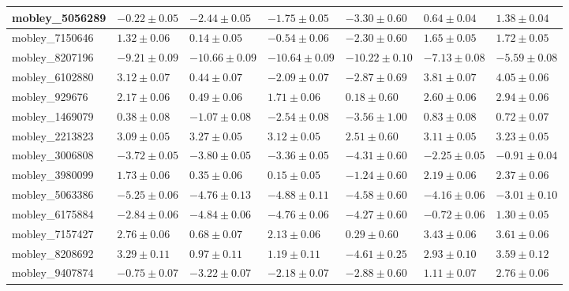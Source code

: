 \documentclass{article}
\begin{document}
\begin{landscape}
\begin{longtable}{|l{3.0cm}|l{3.0cm}|l{3.2cm}|l{3.6cm}|l{3.0cm}|l{3.0cm}|l{3.0cm}|}
mobley\_5056289	&	$	-0.22	\pm	0.05	$	&	$	-2.44	\pm	0.05	$	&	$	-1.75	\pm	0.05	$	&	$	-3.30	\pm	0.60	$	&	$	0.64	\pm	0.04	$	&	$	1.38	\pm	0.04	$	\\ \hline
mobley\_7150646	&	$	1.32	\pm	0.06	$	&	$	0.14	\pm	0.05	$	&	$	-0.54	\pm	0.06	$	&	$	-2.30	\pm	0.60	$	&	$	1.65	\pm	0.05	$	&	$	1.72	\pm	0.05	$	\\ \hline
mobley\_8207196	&	$	-9.21	\pm	0.09	$	&	$	-10.66	\pm	0.09	$	&	$	-10.64	\pm	0.09	$	&	$	-10.22	\pm	0.10	$	&	$	-7.13	\pm	0.08	$	&	$	-5.59	\pm	0.08	$	\\ \hline
mobley\_6102880	&	$	3.12	\pm	0.07	$	&	$	0.44	\pm	0.07	$	&	$	-2.09	\pm	0.07	$	&	$	-2.87	\pm	0.69	$	&	$	3.81	\pm	0.07	$	&	$	4.05	\pm	0.06	$	\\ \hline
mobley\_929676	&	$	2.17	\pm	0.06	$	&	$	0.49	\pm	0.06	$	&	$	1.71	\pm	0.06	$	&	$	0.18	\pm	0.60	$	&	$	2.60	\pm	0.06	$	&	$	2.94	\pm	0.06	$	\\ \hline
mobley\_1469079	&	$	0.38	\pm	0.08	$	&	$	-1.07	\pm	0.08	$	&	$	-2.54	\pm	0.08	$	&	$	-3.56	\pm	1.00	$	&	$	0.83	\pm	0.08	$	&	$	0.72	\pm	0.07	$	\\ \hline
mobley\_2213823	&	$	3.09	\pm	0.05	$	&	$	3.27	\pm	0.05	$	&	$	3.12	\pm	0.05	$	&	$	2.51	\pm	0.60	$	&	$	3.11	\pm	0.05	$	&	$	3.23	\pm	0.05	$	\\ \hline
mobley\_3006808	&	$	-3.72	\pm	0.05	$	&	$	-3.80	\pm	0.05	$	&	$	-3.36	\pm	0.05	$	&	$	-4.31	\pm	0.60	$	&	$	-2.25	\pm	0.05	$	&	$	-0.91	\pm	0.04	$	\\ \hline
mobley\_3980099	&	$	1.73	\pm	0.06	$	&	$	0.35	\pm	0.06	$	&	$	0.15	\pm	0.05	$	&	$	-1.24	\pm	0.60	$	&	$	2.19	\pm	0.06	$	&	$	2.37	\pm	0.06	$	\\ \hline
mobley\_5063386	&	$	-5.25	\pm	0.06	$	&	$	-4.76	\pm	0.13	$	&	$	-4.88	\pm	0.11	$	&	$	-4.58	\pm	0.60	$	&	$	-4.16	\pm	0.06	$	&	$	-3.01	\pm	0.10	$	\\ \hline
mobley\_6175884	&	$	-2.84	\pm	0.06	$	&	$	-4.84	\pm	0.06	$	&	$	-4.76	\pm	0.06	$	&	$	-4.27	\pm	0.60	$	&	$	-0.72	\pm	0.06	$	&	$	1.30	\pm	0.05	$	\\ \hline
mobley\_7157427	&	$	2.76	\pm	0.06	$	&	$	0.68	\pm	0.07	$	&	$	2.13	\pm	0.06	$	&	$	0.29	\pm	0.60	$	&	$	3.43	\pm	0.06	$	&	$	3.61	\pm	0.06	$	\\ \hline
mobley\_8208692	&	$	3.29	\pm	0.11	$	&	$	0.97	\pm	0.11	$	&	$	1.19	\pm	0.11	$	&	$	-4.61	\pm	0.25	$	&	$	2.93	\pm	0.10	$	&	$	3.59	\pm	0.12	$	\\ \hline
mobley\_9407874	&	$	-0.75	\pm	0.07	$	&	$	-3.22	\pm	0.07	$	&	$	-2.18	\pm	0.07	$	&	$	-2.88	\pm	0.60	$	&	$	1.11	\pm	0.07	$	&	$	2.76	\pm	0.06	$	\\ \hline

\end{longtable}
\end{landscape}
\end{document}
